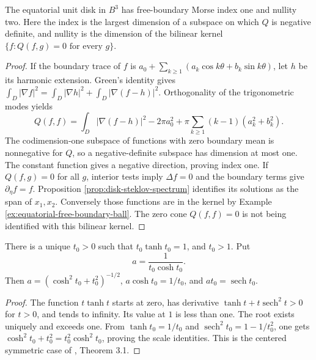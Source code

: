 \begin{proposition}\label{prop:equatorial-disk-index}
The equatorial unit disk in $B^3$ has free-boundary Morse index one and nullity two. Here the index is the largest dimension of a subspace on which $Q$ is negative definite, and nullity is the dimension of the bilinear kernel $\{f:Q(f,g)=0\text{ for every }g\}$.
\end{proposition}
\begin{proof}
If the boundary trace of $f$ is $a_0+\sum_{k\geq1}(a_k\cos k\theta+b_k\sin k\theta)$, let $h$ be its harmonic extension. Green's identity gives
$\int_D|\nabla f|^2=\int_D|\nabla h|^2+\int_D|\nabla(f-h)|^2$.
Orthogonality of the trigonometric modes yields
\[
 Q(f,f)=\int_D|\nabla(f-h)|^2-2\pi a_0^2
       +\pi\sum_{k\geq1}(k-1)(a_k^2+b_k^2).
\]
The codimension-one subspace of functions with zero boundary mean is nonnegative for $Q$, so a negative-definite subspace has dimension at most one. The constant function gives a negative direction, proving index one. If $Q(f,g)=0$ for all $g$, interior tests imply $\Delta f=0$ and the boundary terms give $\partial_\eta f=f$. Proposition \ref{prop:disk-steklov-spectrum} identifies its solutions as the span of $x_1,x_2$. Conversely those functions are in the kernel by Example \ref{ex:equatorial-free-boundary-ball}. The zero cone $Q(f,f)=0$ is not being identified with this bilinear kernel.
\end{proof}

\begin{lemma}\label{lem:critical-catenoid-parameter}
There is a unique $t_0>0$ such that $t_0\tanh t_0=1$, and $t_0>1$. Put
\[
 a=\frac1{t_0\cosh t_0}.
\]
Then $a=(\cosh^2t_0+t_0^2)^{-1/2}$, $a\cosh t_0=1/t_0$, and $at_0=\operatorname{sech}t_0$.
\end{lemma}
\begin{proof}
The function $t\tanh t$ starts at zero, has derivative $\tanh t+t\operatorname{sech}^2t>0$ for $t>0$, and tends to infinity. Its value at $1$ is less than one. The root exists uniquely and exceeds one. From $\tanh t_0=1/t_0$ and $\operatorname{sech}^2t_0=1-1/t_0^2$, one gets $\cosh^2t_0+t_0^2=t_0^2\cosh^2t_0$, proving the scale identities. This is the centered symmetric case of \cite{FS11}, Theorem 3.1.
\end{proof}

